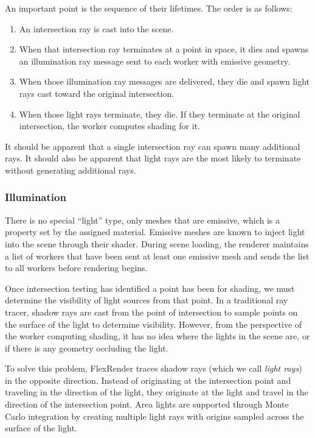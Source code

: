 \documentclass[a4paper,twoside]{article}
\begin{document}
An important point is the sequence of their lifetimes. The order is as follows:

\begin{enumerate}
    \item An intersection ray is cast into the scene.
    \item When that intersection ray terminates at a point in space, it dies and
        spawns an illumination ray message sent to each worker with emissive
        geometry.
    \item When those illumination ray messages are delivered, they die and spawn
        light rays cast toward the original intersection.
    \item When those light rays terminate, they die. If they terminate at the
        original intersection, the worker computes shading for it.
\end{enumerate}

It should be apparent that a single intersection ray can spawn many additional
rays. It should also be apparent that light rays are the most likely to terminate
without generating additional rays.

\subsubsection{Illumination}
\label{illumination}

There is no special ``light'' type, only meshes that are emissive, which is a
property set by the assigned material. Emissive meshes are known to inject
light into the scene through their shader. During scene loading, the renderer
maintains a list of workers that have been sent at least one emissive mesh and
sends the list to all workers before rendering begins.

Once intersection testing has identified a point has been for shading, we
must determine the visibility of light sources from that point. In a traditional
ray tracer, shadow rays are cast from the point of intersection to sample points
on the surface of the light to determine visibility. However, from the perspective
of the worker computing shading, it has no idea where the lights in the scene
are, or if there is any geometry occluding the light.

To solve this problem, FlexRender traces shadow rays (which we call \emph{light rays})
in the opposite direction. Instead of originating at the intersection point and
traveling in the direction of the light, they originate at the light and travel
in the direction of the intersection point. Area lights are supported through
Monte Carlo integration by creating multiple light rays with origins sampled
across the surface of the light.
\end{document}
